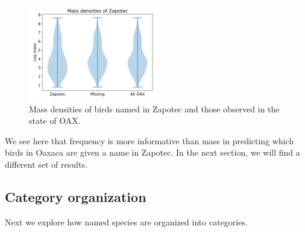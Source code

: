 \documentclass[10pt,letterpaper]{article}
\begin{document}
\begin{figure}[h!]
  \begin{center}
    \includegraphics[width=0.5\textwidth]{./figures/birdmass-violinplots.png}
        \caption{Mass densities of birds named in Zapotec and those observed in the state of OAX.}
        \label{fig-birdmassviolin}
  \end{center}
\end{figure}

We see here that frequency is more informative than mass in predicting which birds in Oaxaca are given a name in Zapotec. In the next section, we will find a different set of results.


\subsection{Category organization}

Next we explore how named species are organized into categories. 


\end{document}
